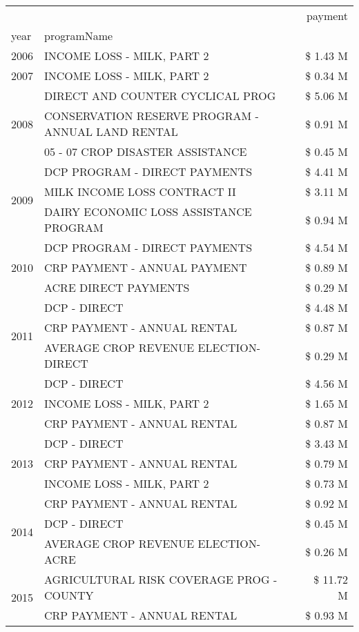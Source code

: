 \begin{tabular}{llr}
\toprule
 &  & payment \\
year & programName &  \\
\midrule
2006 & INCOME LOSS - MILK, PART 2 & \$ 1.43 M \\
\cline{1-3}
2007 & INCOME LOSS - MILK, PART 2 & \$ 0.34 M \\
\cline{1-3}
\multirow[t]{3}{*}{2008} & DIRECT AND COUNTER CYCLICAL PROG & \$ 5.06 M \\
 & CONSERVATION RESERVE PROGRAM - ANNUAL LAND RENTAL & \$ 0.91 M \\
 & 05 - 07 CROP DISASTER ASSISTANCE & \$ 0.45 M \\
\cline{1-3}
\multirow[t]{3}{*}{2009} & DCP PROGRAM - DIRECT PAYMENTS & \$ 4.41 M \\
 & MILK INCOME LOSS CONTRACT II & \$ 3.11 M \\
 & DAIRY ECONOMIC LOSS ASSISTANCE PROGRAM & \$ 0.94 M \\
\cline{1-3}
\multirow[t]{3}{*}{2010} & DCP PROGRAM - DIRECT PAYMENTS & \$ 4.54 M \\
 & CRP PAYMENT - ANNUAL PAYMENT & \$ 0.89 M \\
 & ACRE DIRECT PAYMENTS & \$ 0.29 M \\
\cline{1-3}
\multirow[t]{3}{*}{2011} & DCP - DIRECT & \$ 4.48 M \\
 & CRP PAYMENT - ANNUAL RENTAL & \$ 0.87 M \\
 & AVERAGE CROP REVENUE ELECTION-DIRECT & \$ 0.29 M \\
\cline{1-3}
\multirow[t]{3}{*}{2012} & DCP - DIRECT & \$ 4.56 M \\
 & INCOME LOSS - MILK, PART 2 & \$ 1.65 M \\
 & CRP PAYMENT - ANNUAL RENTAL & \$ 0.87 M \\
\cline{1-3}
\multirow[t]{3}{*}{2013} & DCP - DIRECT & \$ 3.43 M \\
 & CRP PAYMENT - ANNUAL RENTAL & \$ 0.79 M \\
 & INCOME LOSS - MILK, PART 2 & \$ 0.73 M \\
\cline{1-3}
\multirow[t]{3}{*}{2014} & CRP PAYMENT - ANNUAL RENTAL & \$ 0.92 M \\
 & DCP - DIRECT & \$ 0.45 M \\
 & AVERAGE CROP REVENUE ELECTION-ACRE & \$ 0.26 M \\
\cline{1-3}
\multirow[t]{3}{*}{2015} & AGRICULTURAL RISK COVERAGE PROG - COUNTY & \$ 11.72 M \\
 & CRP PAYMENT - ANNUAL RENTAL & \$ 0.93 M \\

\end{tabular}
